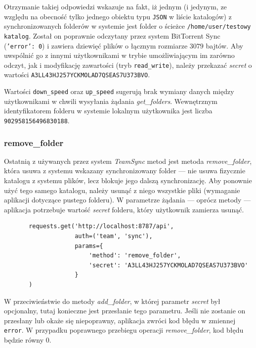 \documentclass[polish,a4paper,twoside]{ppfcmthesis}
\begin{document}
Otrzymanie takiej odpowiedzi wskazuje na fakt, iż jednym (i jedynym, ze względu na obecność tylko jednego obiektu typu \texttt{JSON} w liście katalogów) z synchronizowanych folderów w systemie jest folder o ścieżce \texttt{/home/user\-/testowy katalog}. Został on poprawnie odczytany przez system BitTorrent Sync (\texttt{'error': 0}) i zawiera dziewięć plików o łącznym rozmiarze $3079$ bajtów. Aby uwspólnić go z innymi użytkownikami w trybie umożliwiającym im zarówno odczyt, jak i modyfikację zawartości (tryb \texttt{read\_write}), należy przekazać \emph{secret} o wartości \texttt{A3LL43HJ\-257YCKMO\-LAD7QSEAS\-7U373BVO}.

Wartości \texttt{down\_speed} oraz \texttt{up\_speed} sugerują brak wymiany danych między użytkownikami w chwili wysyłania żądania \emph{get\_folders}. Wewnętrznym identyfikatorem folderu w systemie lokalnym użytkownika jest liczba \texttt{902958156496830188}.

\subsubsection*{remove\_folder}

Ostatnią z używanych przez system \emph{TeamSync} metod jest metoda \emph{remove\_folder}, która usuwa z systemu wskazany synchronizowany folder --- nie usuwa fizycznie katalogu z systemu plików, lecz blokuje jego dalszą synchronizację. Aby ponownie użyć tego samego katalogu, należy usunąć z niego wszystkie pliki (wymaganie aplikacji dotyczące pustego folderu). W parametrze żądania --- oprócz metody --- aplikacja potrzebuje wartość \emph{secret} folderu, który użytkownik zamierza usunąć.

\begin{minipage}{\linewidth}
\vspace{15pt}
\begin{verbatim}
       requests.get('http://localhost:8787/api',
                    auth=('team', 'sync'),
                    params={
                        'method': 'remove_folder',
                        'secret': 'A3LL43HJ257YCKMOLAD7QSEAS7U373BVO'
                    }
       )
\end{verbatim}
\vspace{15pt}
\end{minipage}

W przeciwieństwie do metody \emph{add\_folder}, w której parametr \emph{secret} był opcjonalny, tutaj konieczne jest przesłanie tego parametru. Jeśli nie zostanie on przesłany lub okaże się niepoprawny, aplikacja zwróci kod błędu w zmiennej \texttt{error}. W przypadku poprawnego przebiegu operacji \emph{remove\_folder}, kod błędu będzie równy $0$.
\end{document}
